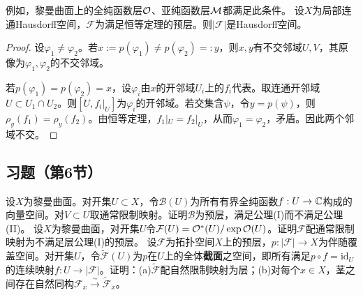 例如，黎曼曲面上的全纯函数层$\mathcal O$、亚纯函数层$\mathcal M$都满足此条件。
设$X$为局部连通Hausdorff空间，$\mathcal F$为满足恒等定理的预层。则$|\mathcal F|$是Hausdorff空间。
\begin{proof}
设$\varphi_1\ne\varphi_2$。若$x:=p(\varphi_1)\ne p(\varphi_2)=:y$，则$x,y$有不交邻域$U,V$，其原像为$\varphi_1,\varphi_2$的不交邻域。

若$p(\varphi_1)=p(\varphi_2)=x$，设$\varphi_i$由$x$的开邻域$U_i$上的$f_i$代表。取连通开邻域$U\subset U_1\cap U_2$。则$[U,f_i|_U]$为$\varphi_i$的开邻域。若交集含$\psi$，令$y=p(\psi)$，则$\rho_y(f_1)=\rho_y(f_2)$。由恒等定理，$f_1|_U=f_2|_U$，从而$\varphi_1=\varphi_2$，矛盾。因此两个邻域不交。
\end{proof}
\subsection*{习题（第6节）}
设$X$为黎曼曲面。对开集$U\subset X$，令$\mathcal B(U)$为所有有界全纯函数$f:U\to\mathbb C$构成的向量空间。对$V\subset U$取通常限制映射。证明$\mathcal B$为预层，满足公理(I)而不满足公理(II)。
设$X$为黎曼曲面，对开集$U$令$\mathcal F(U)=\mathcal O^*(U)/\exp\mathcal O(U)$。证明$\mathcal F$配通常限制映射为不满足层公理(I)的预层。
设$\mathcal F$为拓扑空间$X$上的预层，$p:|\mathcal F|\to X$为伴随覆盖空间。对开集$U$，令$\widetilde{\mathcal F}(U)$为$p$在$U$上的全体\textbf{截面}之空间，即所有满足$p\circ f=\mathrm{id}_U$的连续映射$f:U\to|\mathcal F|$。证明：(a)$\widetilde{\mathcal F}$配自然限制映射为层；(b)对每个$x\in X$，茎之间存在自然同构$\mathcal F_x\xrightarrow{\sim}\widetilde{\mathcal F}_x$。
